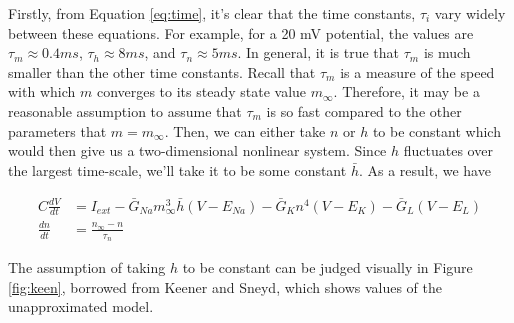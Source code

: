 \documentclass{article}
\begin{document}
Firstly, from Equation \ref{eq:time}, it's clear that the time constants, $\tau_i$ vary widely between these equations. For example, for a 20 mV potential, the values are $\tau_m \approx 0.4 ms$, $\tau_h \approx 8 ms$, and $\tau_n \approx 5 ms$. In general, it is true that $\tau_m$ is much smaller than the other time constants. Recall that $\tau_m$ is a measure of the speed with which $m$ converges to its steady state value $m_\infty$. Therefore, it may be a reasonable assumption to assume that $\tau_m$ is so fast compared to the other parameters that $m = m_\infty$. Then, we can either take $n$ or $h$ to be constant which would then give us a two-dimensional nonlinear system. Since $h$ fluctuates over the largest time-scale, we'll take it to be some constant $\bar{h}$. As a result, we have 

\begin{align*}
        C\frac{dV}{dt} &= I_{ext} -\bar{G}_{Na}m_\infty^3\bar{h}(V-E_{Na}) -\bar{G}_{K}n^4(V-E_{K})  -\bar{G}_{L}(V-E_{L}) \\
    \frac{dn}{dt} &= \frac{n_{\infty}-n}{\tau_n} 
\end{align*}

The assumption of taking $h$ to be constant can be judged visually in Figure \ref{fig:keen}, borrowed from Keener and Sneyd, which shows values of the unapproximated model\cite{keener}.
\end{document}
